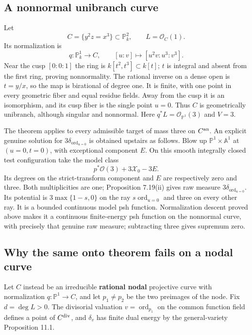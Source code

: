 \documentclass[11pt]{article}
\begin{document}
\subsection{A nonnormal unibranch
curve}\label{a-nonnormal-unibranch-curve}

Let \[C=\{y^2z=x^3\}\subset\mathbb P^2_k,\qquad L=\mathcal O_C(1).\] Its
normalization is
\[q:\mathbb P^1_k\longrightarrow C,\qquad [u:v]\longmapsto[u^2v:u^3:v^3].\]
Near the cusp \([0:0:1]\) the ring is \(k[t^2,t^3]\subset k[t]\); \(t\)
is integral and absent from the first ring, proving nonnormality. The
rational inverse on a dense open is \(t=y/x\), so the map is birational
of degree one. It is finite, with one point in every geometric fiber and
equal residue fields. Away from the cusp it is an isomorphism, and its
cusp fiber is the single point \(u=0\). Thus \(C\) is geometrically
unibranch, although singular and nonnormal. Here
\(q^*L=\mathcal O_{\mathbb P^1}(3)\) and \(V=3\).

The theorem applies to every admissible target of mass three on
\(C^{\rm an}\). An explicit genuine solution for
\(3\delta_{\operatorname{ord}_{u=0}}\) is obtained upstairs as follows.
Blow up \(\mathbb P^1\times\mathbb A^1\) at \((u=0,t=0)\), with
exceptional component \(E\). On this smooth integrally closed test
configuration take the model class
\[p^*\mathcal O(3)+3\mathcal X_0-3E.\] Its degrees on the
strict-transform component and \(E\) are respectively zero and three.
Both multiplicities are one; Proposition 7.19(ii) gives raw measure
\(3\delta_{\operatorname{ord}_{u=0}}\). Its potential is
\(3\max\{1-s,0\}\) on the ray \(s\operatorname{ord}_{u=0}\) and three on
every other ray. It is a bounded continuous model psh function.
Normalization descent proved above makes it a continuous finite-energy
psh function on the nonnormal curve, with precisely that genuine raw
measure; subtracting three gives supremum zero.

\subsection{Why the same onto theorem fails on a nodal
curve}\label{why-the-same-onto-theorem-fails-on-a-nodal-curve}

Let \(C\) instead be an irreducible \textbf{rational nodal} projective
curve with normalization \(q:\mathbb P^1\to C\), and let \(p_1\ne p_2\)
be the two preimages of the node. Fix \(d=\deg L>0\). The divisorial
valuation \(v=\operatorname{ord}_{p_1}\) on the common function field
defines a point of \(C^{\rm div}\), and \(\delta_v\) has finite dual
energy by the general-variety Proposition 11.1.
\end{document}
